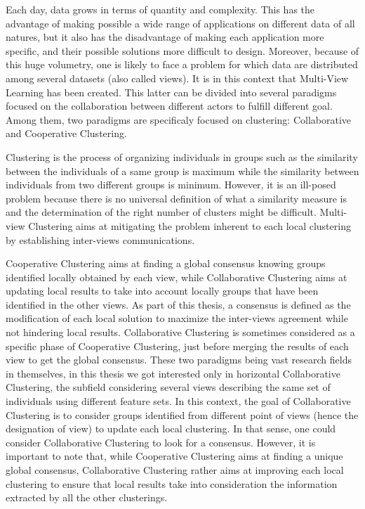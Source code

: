 Each day, data grows in terms of quantity and complexity. This has the advantage of making possible a wide range of applications on different data of all natures, but it also has the disadvantage of making each application more specific, and their possible solutions more difficult to design. Moreover, because of this huge volumetry, one is likely to face a problem for which data are distributed among several datasets (also called views). It is in this context that Multi-View Learning has been created. This latter can be divided into several paradigms focused on the collaboration between different actors to fulfill different goal. Among them, two paradigms are specificaly focused on clustering: Collaborative and Cooperative Clustering.

Clustering is the process of organizing individuals in groups such as the similarity between the individuals of a same group is maximum while the similarity between individuals from two different groups is minimum. However, it is an ill-posed problem because there is no universal definition of what a similarity measure is and the determination of the right number of clusters might be difficult. Multi-view Clustering aims at mitigating the problem inherent to each local clustering by establishing inter-views communications.

Cooperative Clustering aims at finding a global consensus knowing groups identified locally obtained by each view, while Collaborative Clustering aims at updating local results to take into account locally groups that have been identified in the other views. As part of this thesis, a consensus is defined as the modification of each local solution to maximize the inter-views agreement while not hindering local results. Collaborative Clustering is sometimes considered as a specific phase of Cooperative Clustering, just before merging the results of each view to get the global consensus. These two paradigms being vast research fields in themselves, in this thesis we got interested only in horizontal Collaborative Clustering, the subfield considering several views describing the same set of individuals using different feature sets. In this context, the goal of Collaborative Clustering is to consider groups identified from different point of views (hence the designation of view) to update each local clustering. In that sense, one could consider Collaborative Clustering to look for a consensus. However, it is important to note that, while Cooperative Clustering aims at finding a unique global consensus, Collaborative Clustering rather aims at improving each local clustering to ensure that local results take into consideration the information extracted by all the other clusterings.

